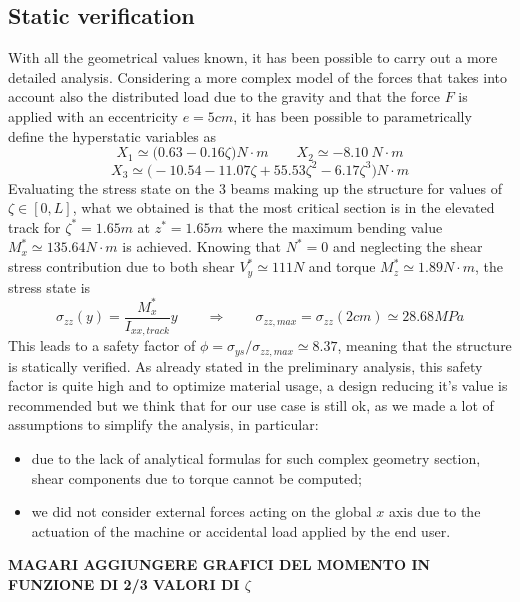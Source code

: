 \subsection{Static verification}
	With all the geometrical values known, it has been possible to carry out a more detailed analysis. Considering a more complex model of the forces that takes into account also the distributed load due to the gravity and that the force $F$ is applied with an eccentricity $e=5cm$, it has been possible to parametrically define the hyperstatic variables as
	\[ X_1 \simeq \big( 0.63-0.16\zeta\big) N\cdot m \qquad X_2 \simeq -8.10 \ N\cdot m \] \[ X_3 \simeq \big( - 10.54 - 11.07\zeta + 55.53\zeta^2 - 6.17\zeta^3 \big) N\cdot m \]
	Evaluating the stress state on the 3 beams making up the structure for values of $\zeta \in [0,L]$, what we obtained is that the most critical section is in the elevated track for $\zeta^* = 1.65m$ at $z^* = 1.65m$ where the maximum bending value $M_x^* \simeq 135.64N\cdot m$ is achieved. Knowing that $N^* = 0$ and neglecting the shear stress contribution due to both shear $V_y^* \simeq 111N$ and torque $M_z^* \simeq 1.89N\cdot m$, the stress state is
	\[ \sigma_{zz}(y) = \frac{M_x^*}{I_{xx,track}}y \qquad \Rightarrow \qquad \sigma_{zz,max} = \sigma_{zz}(2cm) \simeq 28.68 MPa   \]
	This leads to a safety factor of $\phi = \sigma_{ys}/\sigma_{zz,max} \simeq 8.37$, meaning that the structure is statically verified. As already stated in the preliminary analysis, this safety factor is quite high and to optimize material usage, a design reducing it's value is recommended but we think that for our use case is still ok, as we made a lot of assumptions to simplify the analysis, in particular:
	\begin{itemize}
		\item due to the lack of analytical formulas for such complex geometry section, shear components due to torque cannot be computed;
		\item we did not consider external forces acting on the global $x$ axis due to the actuation of the machine or accidental load applied by the end user.
	\end{itemize}

	\textbf{MAGARI AGGIUNGERE GRAFICI DEL MOMENTO IN FUNZIONE DI 2/3 VALORI DI $\zeta$}